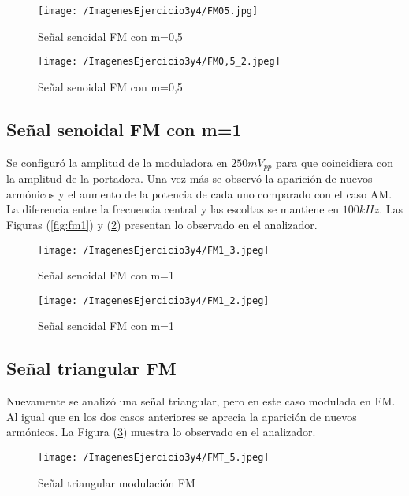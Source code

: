 \begin{figure}[H]
  \centering
  \begin{minipage}[b]{0.6\textwidth}
    \texttt{[image: /ImagenesEjercicio3y4/FM05.jpg]}
    \caption{Señal senoidal FM con m=0,5}
    \label{fig:fm05}
  \end{minipage}
  \hfill
  \begin{minipage}[b]{0.6\textwidth}
    \texttt{[image: /ImagenesEjercicio3y4/FM0,5\_2.jpeg]}
    \caption{Señal senoidal FM con m=0,5}
    \label{fig:fm055}
  \end{minipage}
\end{figure}

\subsection{Señal senoidal FM con m=1}
Se configuró la amplitud de la moduladora en $250 mV_{pp}$ para que coincidiera con la amplitud de la portadora. Una vez más se observó la aparición de nuevos armónicos y el aumento de la potencia de cada uno comparado con el caso AM. La diferencia entre la frecuencia central y las escoltas se mantiene en $100 kHz$. Las Figuras (\ref{fig:fm1}) y (\ref{fig:fm1_5}) presentan lo observado en el analizador.

\begin{figure}[H]
  \centering
  \begin{minipage}[b]{0.6\textwidth}
    \texttt{[image: /ImagenesEjercicio3y4/FM1\_3.jpeg]}
    \caption{Señal senoidal FM con m=1}
    \label{fig:fm1}
  \end{minipage}
  \hfill
  \begin{minipage}[b]{0.6\textwidth}
    \texttt{[image: /ImagenesEjercicio3y4/FM1\_2.jpeg]}
    \caption{Señal senoidal FM con m=1}
    \label{fig:fm1_5}
  \end{minipage}
\end{figure}

\subsection{Señal triangular FM}
Nuevamente se analizó una señal triangular, pero en este caso modulada en FM. Al igual que en los dos casos anteriores se aprecia la aparición de nuevos armónicos. La Figura (\ref{fig:fmt1}) muestra lo observado en el analizador.

\begin{figure}[H]
	\centering
	\texttt{[image: /ImagenesEjercicio3y4/FMT\_5.jpeg]}
\caption{Señal triangular modulación FM}
	\label{fig:fmt1}
\end{figure}\textbf{}

